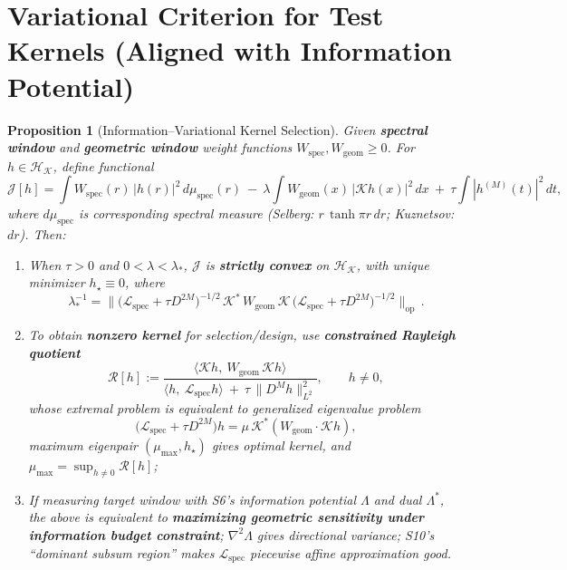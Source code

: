 \documentclass[11pt,a4paper]{article}
\newtheorem{proposition}[theorem]{Proposition}
\theoremstyle{remark}
\begin{document}
\section{Variational Criterion for Test Kernels (Aligned with Information Potential)}

\begin{proposition}[Information--Variational Kernel Selection]\label{prop:variational}
Given \textbf{spectral window} and \textbf{geometric window} weight functions $W_{\mathrm{spec}},W_{\mathrm{geom}}\ge0$. For $h\in \mathscr{H}_{\mathcal{K}}$, define functional
\begin{equation}
\mathcal{J}[h]=\int W_{\mathrm{spec}}(r)\,|h(r)|^2\,d\mu_{\mathrm{spec}}(r)\ -\ \lambda\int W_{\mathrm{geom}}(x)\,|\mathcal{K} h(x)|^2\,dx\ +\ \tau\int |h^{(M)}(t)|^2\,dt,
\end{equation}
where $d\mu_{\mathrm{spec}}$ is corresponding spectral measure (Selberg: $r\,\tanh\pi r\,dr$; Kuznetsov: $dr$). Then:
\begin{enumerate}
\item When $\tau>0$ and $0<\lambda<\lambda_\ast$, $\mathcal{J}$ is \textbf{strictly convex} on $\mathscr{H}_{\mathcal{K}}$, with unique minimizer $h_\star\equiv 0$, where
\begin{equation}
\lambda_\ast^{-1}=\Big\|\big(\mathcal{L}_{\mathrm{spec}}+\tau D^{2M}\big)^{-1/2}\,\mathcal{K}^*\,W_{\mathrm{geom}}\,\mathcal{K}\,\big(\mathcal{L}_{\mathrm{spec}}+\tau D^{2M}\big)^{-1/2}\Big\|_{\mathrm{op}}\,.
\end{equation}

\item To obtain \textbf{nonzero kernel} for selection/design, use \textbf{constrained Rayleigh quotient}
\begin{equation}
\mathcal{R}[h]:=\frac{\big\langle \mathcal{K}h,\ W_{\mathrm{geom}}\,\mathcal{K}h\big\rangle}{\big\langle h,\ \mathcal{L}_{\mathrm{spec}}h\big\rangle\ +\ \tau\,\|D^{M}h\|_{L^{2}}^{2}},\qquad h\neq 0,
\end{equation}
whose extremal problem is equivalent to generalized eigenvalue problem
\begin{equation}
\big(\mathcal{L}_{\mathrm{spec}}+\tau D^{2M}\big)h=\mu\,\mathcal{K}^*\left(W_{\mathrm{geom}}\cdot \mathcal{K} h\right),
\end{equation}
maximum eigenpair $(\mu_{\max},h_\star)$ gives optimal kernel, and $\mu_{\max}=\sup_{h\neq0}\mathcal{R}[h]$;

\item If measuring target window with S6's information potential $\Lambda$ and dual $\Lambda^\ast$, the above is equivalent to \textbf{maximizing geometric sensitivity under information budget constraint}; $\nabla^2\Lambda$ gives directional variance; S10's ``dominant subsum region'' makes $\mathcal{L}_{\mathrm{spec}}$ piecewise affine approximation good.
\end{enumerate}
\end{proposition}
\end{document}
